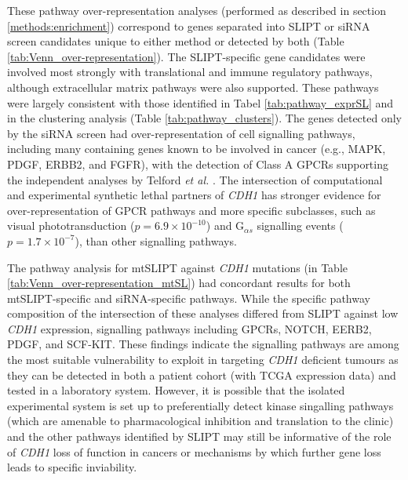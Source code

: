 These pathway over-representation analyses (performed as described in section \ref{methods:enrichment}) correspond to genes separated into SLIPT or siRNA screen candidates unique to either method or detected by both (Table \ref{tab:Venn_over-representation}). The SLIPT-specific gene candidates were involved most strongly with translational and immune regulatory pathways, although extracellular matrix pathways were also supported. These pathways were largely consistent with those identified in Tabel \ref{tab:pathway_exprSL} and in the clustering analysis (Table \ref{tab:pathway_clusters}). The genes detected only by the siRNA screen had over-represent\-ation of cell signalling pathways, including many containing genes known to be involved in cancer (e.g., MAPK, PDGF, ERBB2, and FGFR), with the detection of Class A GPCRs supporting the independent analyses by  Telford \textit{et al.} \cite{Telford2015}. The intersection of computational and experimental synthetic lethal partners of \textit{CDH1} has stronger evidence for over-represent\-ation of GPCR pathways and more specific subclasses, such as visual phototransduction ($p=6.9 \times 10^{-10}$) and G$_{\alpha s}$ signalling events ($p=1.7 \times 10^{-7}$), than other signalling pathways.

The pathway analysis for mtSLIPT against \textit{CDH1} mutations (in Table \ref{tab:Venn_over-representation_mtSL}) had concordant results for both mtSLIPT-specific and siRNA-specific pathways. While the specific pathway composition of the intersection of these analyses differed from SLIPT against low \textit{CDH1} expression, signalling pathways including GPCRs, NOTCH, EERB2, PDGF, and SCF-KIT. These findings indicate the signalling pathways are among the most suitable vulnerability to exploit in targeting \textit{CDH1} deficient tumours as they can be detected in both a patient cohort (with TCGA expression data) and tested in a laboratory system. However, it is possible that the isolated experimental system is set up to preferentially detect kinase singalling pathways (which are amenable to pharmacological inhibition and translation to the clinic) and the other pathways identified by SLIPT may still be informative of the role of \textit{CDH1} loss of function in cancers or mechanisms by which further gene loss leads to specific inviability.



\FloatBarrier

 \label{chapt3:compare_pathway_perm}

